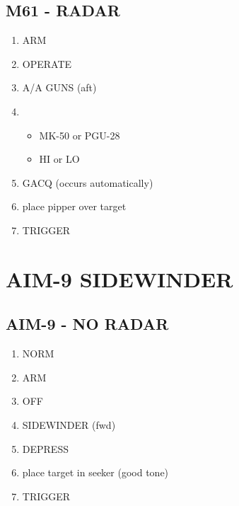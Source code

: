 \documentclass[fontHelvetica, widesubsec]{TechCheck}
\begin{document}
	\subsection{M61 - RADAR}
	\begin{enumerate}
		\item {}\dotfill ARM
		\item {}\dotfill OPERATE
		\item {}\dotfill A/A GUNS (aft)
		\item {}
		\begin{itemize}
			\item {} MK-50 or PGU-28
			\item {} HI or LO
		\end{itemize}
	\item {}\dotfill GACQ (occurs automatically)
	\item {}\dotfill place pipper over target
	\item {}\dotfill TRIGGER
	\end{enumerate}

	\section{AIM-9 SIDEWINDER}

	\subsection{AIM-9 - NO RADAR}
	\begin{enumerate}
		\item {}\dotfill NORM
		\item {}\dotfill ARM
		\item {}\dotfill OFF
		\item {}\dotfill SIDEWINDER (fwd)
		\item {}\dotfill DEPRESS
		\item {}\dotfill place target in seeker (good tone)
		\item {}\dotfill TRIGGER
	\end{enumerate}
\end{document}
